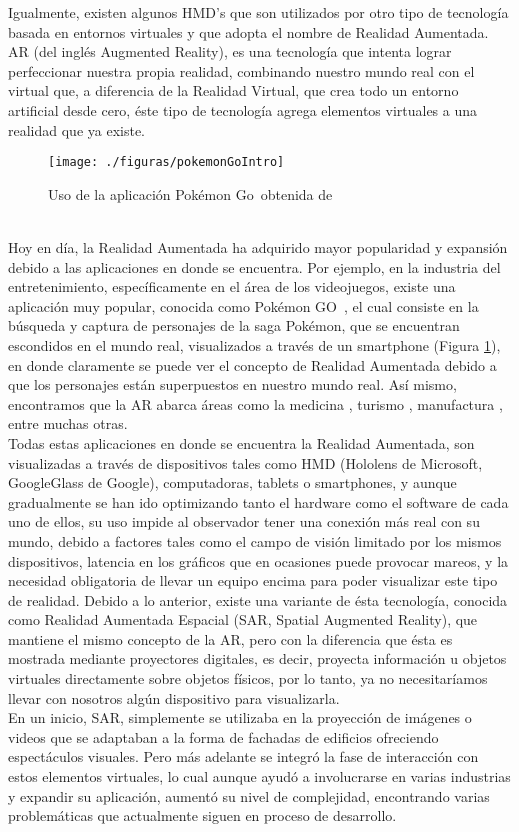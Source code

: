 \documentclass[a4paper,openright,12pt]{report}
\begin{document}
Igualmente, existen algunos HMD’s que son utilizados por otro tipo de tecnología basada en entornos virtuales y que adopta el nombre de Realidad Aumentada.\\
AR (del inglés Augmented Reality), es una tecnología que intenta lograr perfeccionar nuestra propia realidad, combinando nuestro mundo real con el virtual que, a diferencia de la Realidad Virtual, que crea todo un entorno artificial desde cero, éste tipo de tecnología agrega elementos virtuales a una realidad que ya existe.
\begin{figure}[h]
	\centering
	\texttt{[image: ./figuras/pokemonGoIntro]}
	\caption[Uso de la aplicación Pokémon Go\textcopyright ]{Uso de la aplicación Pokémon Go\textcopyright\ obtenida de \citep{Dorward2017}} \label{fig:pokemonGoIntro}
\end{figure}\\
Hoy en día, la Realidad Aumentada ha adquirido mayor popularidad y expansión debido a las aplicaciones en donde se encuentra. Por ejemplo, en la industria del entretenimiento, específicamente en el área de los videojuegos, existe una aplicación muy popular, conocida como Pokémon GO\textcopyright\ \citep{Dorward2017}, el cual consiste en la búsqueda y captura de personajes de la saga Pokémon, que se encuentran escondidos en el mundo real, visualizados a través de un smartphone (Figura \ref{fig:pokemonGoIntro}), en donde claramente se puede ver el concepto de Realidad Aumentada debido a que los personajes están superpuestos en nuestro mundo real. Así mismo, encontramos que la AR abarca áreas como la medicina \citep{Marescaux2004,Ploder1995}, turismo \citep{Kounavis2012}, manufactura \citep{Frund2004}, entre muchas otras.\\
Todas estas aplicaciones en donde se encuentra la Realidad Aumentada, son visualizadas a través de dispositivos tales como HMD (Hololens de Microsoft, GoogleGlass de Google), computadoras, tablets o smartphones, y aunque gradualmente se han ido optimizando tanto el hardware como el software de cada uno de ellos, su uso impide al observador tener una conexión más real con su mundo, debido a factores tales como el campo de visión limitado por los mismos dispositivos, latencia en los gráficos que en ocasiones puede provocar mareos, y la necesidad obligatoria de llevar un equipo encima para poder visualizar este tipo de realidad. Debido a lo anterior, existe una variante de ésta tecnología, conocida como Realidad Aumentada Espacial (SAR, Spatial Augmented Reality), que mantiene el mismo concepto de la AR, pero con la diferencia que ésta es mostrada mediante proyectores digitales, es decir, proyecta información u objetos virtuales directamente sobre objetos físicos, por lo tanto, ya no necesitaríamos llevar con nosotros algún dispositivo para visualizarla.\\
En un inicio, SAR, simplemente se utilizaba en la proyección de imágenes o videos que se adaptaban a la forma de fachadas de edificios ofreciendo espectáculos visuales. Pero más adelante se integró la fase de interacción con estos elementos virtuales, lo cual aunque ayudó a involucrarse en varias industrias y expandir su aplicación, aumentó su nivel de complejidad, encontrando varias problemáticas que actualmente siguen en proceso de desarrollo.
\end{document}
